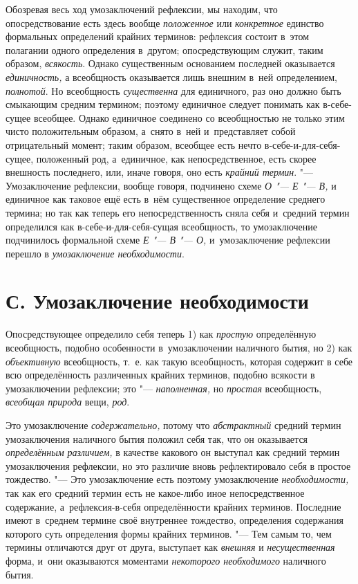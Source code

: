 Обозревая весь ход умозаключений рефлексии, мы находим, что
опосредствование есть здесь вообще
{\em положенное} или
{\em конкретное} единство
формальных определений крайних терминов: рефлексия состоит в~этом полагании
одного определения в~другом; опосредствующим служит, таким образом,
{\em всякость}. Однако
существенным основанием последней оказывается
{\em единичность,} а
всеобщность оказывается лишь внешним в~ней определением,
{\em полнотой}. Но
всеобщность {\em существенна}
для единичного, раз оно должно быть смыкающим средним
термином; поэтому единичное следует понимать как в-себе-сущее всеобщее.
Однако единичное соединено со всеобщностью не только этим чисто
положительным образом, а~снято в~ней и~представляет собой отрицательный
момент; таким образом, всеобщее есть нечто в-себе-и-для-себя-сущее,
положенный род, а~единичное, как непосредственное, есть скорее внешность
последнего, или, иначе говоря, оно есть
{\em крайний термин}. "---
Умозаключение рефлексии, вообще говоря, подчинено схеме
{\em О "--- Е "--- В,}
и единичное как таковое ещё есть в~нём существенное
определение среднего термина; но так как теперь его непосредственность
сняла себя и~средний термин определился как
в-себе-и-для-себя-сущая всеобщность, то умозаключение
подчинилось формальной схеме {\em Е
"--- В "--- О,} и~умозаключение
рефлексии перешло в {\em умозаключение
необходимости}.

\section[С. Умозаключение необходимости]{С. Умозаключение необходимости}

Опосредствующее определило себя теперь 1) как
{\em простую}
определённую всеобщность, подобно особенности в~умозаключении
наличного бытия, но 2) как
{\em объективную}
всеобщность, т.~е. как такую всеобщность, которая содержит в
себе всю определённость различенных крайних терминов, подобно всякости в
умозаключении рефлексии; это
"--- {\em наполненная,} но
{\em простая}
всеобщность, {\em всеобщая
природа} вещи,
{\em род}.

Это умозаключение
{\em содержательно,}
потому что
{\em абстрактный} средний
термин умозаключения наличного бытия положил себя так, что он оказывается
{\em определённым различием,}
в качестве какового он выступал как средний термин
умозаключения рефлексии, но это различие вновь рефлектировало себя в
простое тождество. "--- Это умозаключение есть поэтому
умозаключение {\em необходимости,}
так как его средний термин есть не какое-либо иное
непосредственное содержание, а~рефлексия-в-себя определённости крайних
терминов. Последние имеют в~среднем термине своё внутреннее тождество,
определения содержания которого суть определения формы крайних терминов. "---
Тем самым то, чем термины отличаются друг от друга, выступает
как {\em внешняя} и
{\em несущественная}
форма, и~они оказываются моментами
{\em некоторого необходимого}
наличного бытия.

